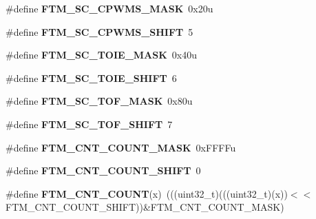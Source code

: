 \begin{DoxyCompactItemize}
\item 
\#define {\bfseries F\+T\+M\+\_\+\+S\+C\+\_\+\+C\+P\+W\+M\+S\+\_\+\+M\+A\+SK}~0x20u\hypertarget{group__FTM__Register__Masks_gaccb41101ca573d24de634c5a19d13467}{}\label{group__FTM__Register__Masks_gaccb41101ca573d24de634c5a19d13467}

\item 
\#define {\bfseries F\+T\+M\+\_\+\+S\+C\+\_\+\+C\+P\+W\+M\+S\+\_\+\+S\+H\+I\+FT}~5\hypertarget{group__FTM__Register__Masks_ga91d4d626c21437a2b8b15e9a2a385727}{}\label{group__FTM__Register__Masks_ga91d4d626c21437a2b8b15e9a2a385727}

\item 
\#define {\bfseries F\+T\+M\+\_\+\+S\+C\+\_\+\+T\+O\+I\+E\+\_\+\+M\+A\+SK}~0x40u\hypertarget{group__FTM__Register__Masks_ga65e89cf2978e1c61f40b229b66b3e7c8}{}\label{group__FTM__Register__Masks_ga65e89cf2978e1c61f40b229b66b3e7c8}

\item 
\#define {\bfseries F\+T\+M\+\_\+\+S\+C\+\_\+\+T\+O\+I\+E\+\_\+\+S\+H\+I\+FT}~6\hypertarget{group__FTM__Register__Masks_ga3d59d98a90d574503733c8a1abd2e7ae}{}\label{group__FTM__Register__Masks_ga3d59d98a90d574503733c8a1abd2e7ae}

\item 
\#define {\bfseries F\+T\+M\+\_\+\+S\+C\+\_\+\+T\+O\+F\+\_\+\+M\+A\+SK}~0x80u\hypertarget{group__FTM__Register__Masks_gaeea3d5615ca8e996e87e6f9aacdfb4fb}{}\label{group__FTM__Register__Masks_gaeea3d5615ca8e996e87e6f9aacdfb4fb}

\item 
\#define {\bfseries F\+T\+M\+\_\+\+S\+C\+\_\+\+T\+O\+F\+\_\+\+S\+H\+I\+FT}~7\hypertarget{group__FTM__Register__Masks_ga1f12d6f2ddbc4a71756f2b0203ab57dd}{}\label{group__FTM__Register__Masks_ga1f12d6f2ddbc4a71756f2b0203ab57dd}

\item 
\#define {\bfseries F\+T\+M\+\_\+\+C\+N\+T\+\_\+\+C\+O\+U\+N\+T\+\_\+\+M\+A\+SK}~0x\+F\+F\+F\+Fu\hypertarget{group__FTM__Register__Masks_ga7a984be18d311688f8a369a43f9145b6}{}\label{group__FTM__Register__Masks_ga7a984be18d311688f8a369a43f9145b6}

\item 
\#define {\bfseries F\+T\+M\+\_\+\+C\+N\+T\+\_\+\+C\+O\+U\+N\+T\+\_\+\+S\+H\+I\+FT}~0\hypertarget{group__FTM__Register__Masks_gacab5bfefd759b4b0d8e4949a872f96e2}{}\label{group__FTM__Register__Masks_gacab5bfefd759b4b0d8e4949a872f96e2}

\item 
\#define {\bfseries F\+T\+M\+\_\+\+C\+N\+T\+\_\+\+C\+O\+U\+NT}(x)~(((uint32\+\_\+t)(((uint32\+\_\+t)(x))$<$$<$F\+T\+M\+\_\+\+C\+N\+T\+\_\+\+C\+O\+U\+N\+T\+\_\+\+S\+H\+I\+FT))\&F\+T\+M\+\_\+\+C\+N\+T\+\_\+\+C\+O\+U\+N\+T\+\_\+\+M\+A\+SK)\hypertarget{group__FTM__Register__Masks_ga96ac13f31821791e3456cf6672b6a3b6}{}\label{group__FTM__Register__Masks_ga96ac13f31821791e3456cf6672b6a3b6}


\end{DoxyCompactItemize}
